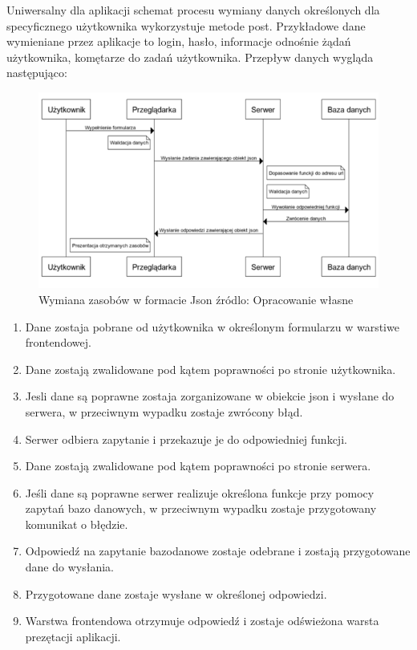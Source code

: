 \documentclass[12pt]{report}
\begin{document}
 Uniwersalny dla aplikacji schemat procesu wymiany danych określonych dla specyficznego użytkownika wykorzystuje metode post. Przykładowe dane wymieniane przez aplikacje to login, hasło, informacje odnośnie żądań użytkownika, komętarze do zadań użytkownika. Przepływ danych wygląda następująco:
 \begin{figure}[!hb]
\centering
\includegraphics[width=\textwidth,height=\textheight,keepaspectratio]{U-P-S-B.png} 
\caption{Wymiana zasobów w formacie Json źródlo: Opracowanie własne}
\end{figure}
\begin{enumerate}
\item Dane zostaja pobrane od użytkownika w określonym formularzu w warstiwe frontendowej.
\item Dane zostają zwalidowane pod kątem poprawności po stronie użytkownika.
\item Jesli dane są poprawne zostaja zorganizowane w obiekcie json i wysłane do serwera, w przeciwnym wypadku zostaje zwrócony błąd.
\item Serwer odbiera zapytanie i przekazuje je do odpowiedniej funkcji.
\item Dane zostają zwalidowane pod kątem poprawności po stronie serwera.
\item Jeśli dane są poprawne serwer realizuje określona funkcje przy pomocy zapytań bazo danowych, w przeciwnym wypadku zostaje przygotowany komunikat o błędzie.
\item Odpowiedź na zapytanie bazodanowe zostaje odebrane i zostają przygotowane dane do wysłania.
\item Przygotowane dane zostaje wysłane w określonej odpowiedzi.
\item Warstwa frontendowa otrzymuje odpowiedź i zostaje odświeżona warsta prezętacji aplikacji.
\end{enumerate}
 
\end{document}

